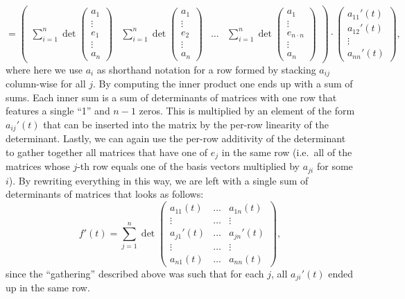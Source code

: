 $$ =  \begin{pmatrix} \sum_{i=1}^{n} \det \begin{pmatrix}
    a_1 \\ \vdots \\ e_1 \\ \vdots \\ a_n
\end{pmatrix} & \sum_{i=1}^{n} \det \begin{pmatrix}
    a_1 \\ \vdots \\ e_2 \\ \vdots \\ a_n
\end{pmatrix} & \ldots & \sum_{i=1}^{n} \det \begin{pmatrix}
    a_1 \\ \vdots \\ e_{n \cdot n} \\ \vdots \\ a_n
\end{pmatrix} \end{pmatrix} \cdot \begin{pmatrix}
    a_{11}'(t) \\
    a_{12}'(t) \\
    \vdots \\
    a_{nn}'(t)
\end{pmatrix},$$
where here we use $a_i$ as shorthand notation for a row formed by stacking $a_{ij}$ column-wise for all $j$.
By computing the inner product one ends up with a sum of sums.
Each inner sum is a sum of determinants of matrices with one row that features a single ``1'' and $n-1$ zeros.
This is multiplied by an element of the form $a_{ij}'(t)$ that can be inserted into the matrix by the per-row linearity of the determinant.
Lastly, we can again use the per-row additivity of the determinant to gather together all matrices that have one of $e_j$ in the same row (i.e.\ all of the matrices whose $j$-th row equals one of the basis vectors multiplied by $a_{ji}$ for some $i$).
By rewriting everything in this way, we are left with a single sum of determinants of matrices that looks as follows:
$$f'(t) = \sum_{j=1}^{n} \det \begin{pmatrix}
    a_{11}(t) & \ldots & a_{1n}(t) \\
    \vdots & \ldots & \vdots \\
    a_{j1}'(t) & \ldots & a_{jn}'(t) \\
    \vdots & \ldots & \vdots \\
    a_{n1}(t) & \ldots & a_{nn}(t)
\end{pmatrix},$$
since the ``gathering'' described above was such that for each $j$, all $a_{ji}'(t)$ ended up in the same row.


